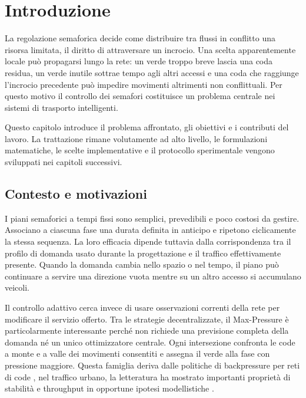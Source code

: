 \documentclass[12pt,a4paper,oneside]{report}
\numberwithin{equation}{chapter}
\begin{document}
\cleardoublepage
\tableofcontents
\cleardoublepage

\chapter{Introduzione}
\label{chap:introduzione}

La regolazione semaforica decide come distribuire tra flussi in conflitto una
risorsa limitata, il diritto di attraversare un incrocio. Una scelta
apparentemente locale può propagarsi lungo la rete:
un verde troppo breve lascia una coda residua, un verde inutile sottrae tempo
agli altri accessi e una coda che raggiunge l'incrocio precedente può impedire
movimenti altrimenti non conflittuali. Per questo motivo il controllo dei
semafori costituisce un problema centrale nei sistemi di trasporto
intelligenti.

Questo capitolo introduce il problema affrontato, gli obiettivi e i contributi
del lavoro. La trattazione rimane volutamente ad alto livello, le formulazioni
matematiche, le scelte implementative e il protocollo sperimentale vengono
sviluppati nei capitoli successivi.

\section{Contesto e motivazioni}

I piani semaforici a tempi fissi sono semplici, prevedibili e poco costosi da
gestire. Associano a ciascuna fase una durata definita in anticipo e
ripetono ciclicamente la stessa sequenza. La loro efficacia dipende tuttavia
dalla corrispondenza tra il profilo di domanda usato durante la progettazione e
il traffico effettivamente presente. Quando la domanda cambia nello spazio o
nel tempo, il piano può continuare a servire una direzione vuota mentre su un
altro accesso si accumulano veicoli.

Il controllo adattivo cerca invece di usare osservazioni correnti della rete
per modificare il servizio offerto. Tra le strategie decentralizzate, il
Max-Pressure è particolarmente interessante perché non richiede una previsione
completa della domanda né un unico ottimizzatore centrale. Ogni intersezione
confronta le code a monte e a valle dei movimenti consentiti e assegna il verde
alla fase con pressione maggiore. Questa famiglia deriva dalle politiche di
backpressure per reti di code \cite{tassiulas1992stability}, nel traffico
urbano, la letteratura ha mostrato importanti proprietà di stabilità e
throughput in opportune ipotesi modellistiche
\cite{varaiya2013maxpressure,wongpiromsarn2012distributed,levin2023review}.
\end{document}
